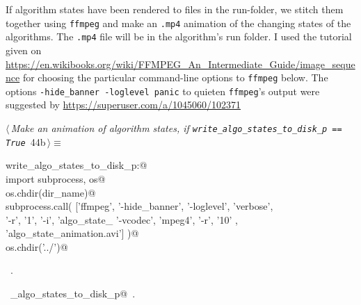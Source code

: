 \documentclass[11.5pt]{report}
\begin{document}
\vspace{-0.8cm}\newchunk If algorithm states have been rendered to files in the run-folder, we stitch them together using \verb|ffmpeg|
and make an \verb|.mp4| animation of the changing states of the algorithms. The \verb|.mp4| file will be in the algorithm's
run folder. I used the  tutorial given on \url{https://en.wikibooks.org/wiki/FFMPEG_An_Intermediate_Guide/image_sequence}
for choosing the particular command-line options to \verb|ffmpeg| below. The options \texttt{-hide\_banner -loglevel panic} 
to quieten \verb|ffmpeg|'s output were suggested by  \url{https://superuser.com/a/1045060/102371} 


\begin{flushleft} \small\label{scrap61}\raggedright\small
{} $\langle\,${\itshape Make an animation of algorithm states, if \verb|write_algo_states_to_disk_p == True|}\nobreak\ {\footnotesize {44b}}$\,\rangle\equiv$
\vspace{-1ex}
\begin{list}{}{} \item
\mbox{}\verb@if write_algo_states_to_disk_p:@\\
\mbox{}\verb@     import subprocess, os@\\
\mbox{}\verb@     os.chdir(dir_name)@\\
\mbox{}\verb@     subprocess.call( ['ffmpeg',  '-hide_banner', '-loglevel', 'verbose', \@\\
\mbox{}\verb@                       '-r', '1',  '-i', 'algo_state_%05d.png', \@\\
\mbox{}\verb@                       '-vcodec', 'mpeg4', '-r', '10' , \@\\
\mbox{}\verb@                       'algo_state_animation.avi']  )@\\
\mbox{}\verb@     os.chdir('../')@\\
\mbox{}\verb@@{\NWsep}
\end{list}
\vspace{-1.5ex}
\footnotesize
\begin{list}{}{\setlength{\itemsep}{-\parsep}\setlength{\itemindent}{-\leftmargin}}
\item \NWtxtMacroRefIn\ .
\item \NWtxtIdentsUsed\nobreak\  \verb@write_algo_states_to_disk_p@\nobreak\ .
\item{}
\end{list}
\vspace{4ex}
\end{flushleft}
\end{document}

